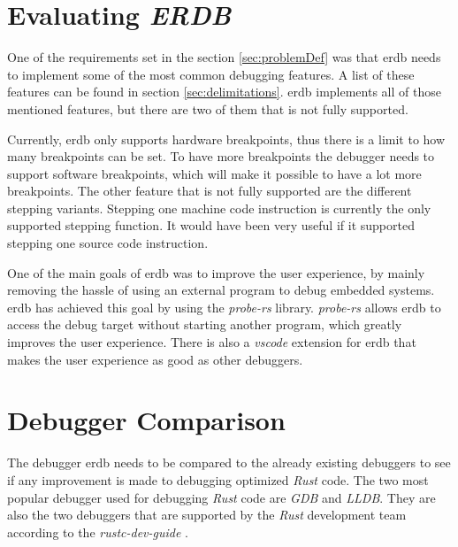 \section{Evaluating \emph{ERDB}} %
One of the requirements set in the section \ref{sec:problemDef} was that \gls{erdb} needs to implement some of the most common debugging features.
A list of these features can be found in section \ref{sec:delimitations}.
\gls{erdb} implements all of those mentioned features, but there are two of them that is not fully supported.


Currently, \gls{erdb} only supports hardware breakpoints, thus there is a limit to how many breakpoints can be set.
To have more breakpoints the debugger needs to support software breakpoints, which will make it possible to have a lot more breakpoints.
The other feature that is not fully supported are the different stepping variants.
Stepping one machine code instruction is currently the only supported stepping function.
It would have been very useful if it supported stepping one source code instruction.


One of the main goals of \gls{erdb} was to improve the user experience, by mainly removing the hassle of using an external program to debug embedded systems.
\gls{erdb} has achieved this goal by using the \emph{probe-rs} library.
\emph{probe-rs} allows \gls{erdb} to access the debug target without starting another program, which greatly improves the user experience.
There is also a \emph{vscode} extension for \gls{erdb} that makes the user experience as good as other debuggers.



\section{Debugger Comparison} %
\label{sec:debuggercomparison}


The debugger \gls{erdb} needs to be compared to the already existing debuggers to see if any improvement is made to debugging optimized \emph{Rust} code.
The two most popular debugger used for debugging \emph{Rust} code are \emph{GDB} and \emph{LLDB}.
They are also the two debuggers that are supported by the \emph{Rust} development team according to the \emph{rustc-dev-guide} \cite{rust-dev-guide}.


